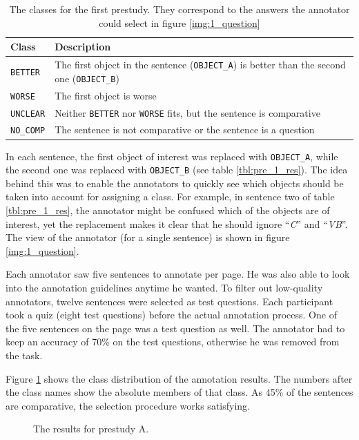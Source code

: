 \begin{table}[h]
\centering
\caption{The classes for the first prestudy. They correspond to the answers the annotator could select in figure \ref{img:1_question}}
\label{tbl:prestudyclasses-a}
\begin{tabular}{@{}ll@{}}
\toprule
Class & Description \\ \midrule
\texttt{BETTER} & The first object in the sentence (\texttt{OBJECT\_A}) is better than the second one (\texttt{OBJECT\_B})\\
\texttt{WORSE} & The first object is worse \\
\texttt{UNCLEAR} & Neither \texttt{BETTER} nor \texttt{WORSE} fits, but the sentence is comparative\\
\texttt{NO\_COMP} & The sentence is not comparative or the sentence is a question\\
\bottomrule
\end{tabular}
\end{table}

In each sentence, the first object of interest was replaced with \texttt{OBJECT\_A}, while the second one was replaced with \texttt{OBJECT\_B} (see table \ref{tbl:pre_1_res}). The idea behind this was to enable the annotators to quickly see which objects should be taken into account for assigning a class. For example, in sentence two of table \ref{tbl:pre_1_res}, the annotator might be confused which of the objects are of interest, yet the replacement makes it clear that he should ignore \enquote{\emph{C}} and \enquote{\emph{VB}}. The view of the annotator (for a single sentence) is shown in figure \ref{img:1_question}.

Each annotator saw five sentences to annotate per page. He was also able to look into the annotation guidelines anytime he wanted. To filter out low-quality annotators, twelve sentences were selected as test questions. Each participant took a quiz (eight test questions) before the actual annotation process. One of the five sentences on the page was a test question as well. The annotator had to keep an accuracy of 70\% on the test questions, otherwise he was removed from the task.

Figure \ref{fig:dist_pre_a} shows the class distribution of the annotation results. The numbers after the class names show the absolute members of that class. As 45\% of the sentences are comparative, the selection procedure works satisfying.

\begin{figure}[h]
\centering
\caption{The results for prestudy A.}
\label{fig:dist_pre_a}
\end{figure}

